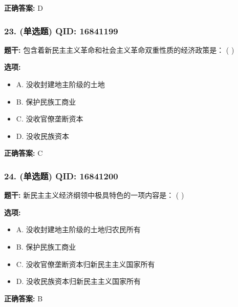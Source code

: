 \documentclass[12pt,UTF8]{ctexart}
\begin{document}
\textbf{正确答案:}
D

\vspace{0.3em}\hrulefill\vspace{0.7em}

\subsubsection*{23. (单选题) \small QID: 16841199}

\textbf{题干:}
包含着新民主主义革命和社会主义革命双重性质的经济政策是： ( )

\textbf{选项:}
\begin{itemize}[leftmargin=*]

  \item A. 没收封建地主阶级的土地

  \item B. 保护民族工商业

  \item C. 没收官僚垄断资本

  \item D. 没收民族资本

\end{itemize}

\textbf{正确答案:}
C

\vspace{0.3em}\hrulefill\vspace{0.7em}

\subsubsection*{24. (单选题) \small QID: 16841200}

\textbf{题干:}
新民主主义经济纲领中极具特色的一项内容是： ( )

\textbf{选项:}
\begin{itemize}[leftmargin=*]

  \item A. 没收封建地主阶级的土地归农民所有

  \item B. 保护民族工商业

  \item C. 没收官僚垄断资本归新民主主义国家所有

  \item D. 没收民族资本归新民主主义国家所有

\end{itemize}

\textbf{正确答案:}
B

\vspace{0.3em}\hrulefill\vspace{0.7em}
\end{document}
